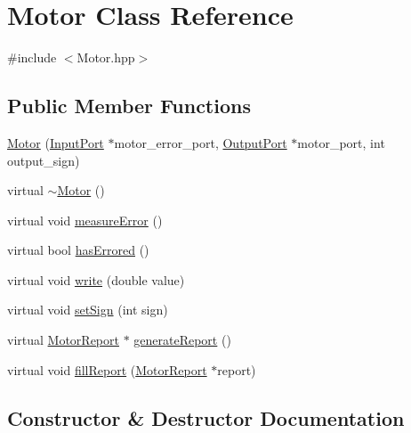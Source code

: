 \hypertarget{classMotor}{}\section{Motor Class Reference}
\label{classMotor}


{\ttfamily \#include $<$Motor.\+hpp$>$}

\subsection*{Public Member Functions}
\begin{DoxyCompactItemize}
\item 
\hyperlink{classMotor_a261f6bcd243dc3c1b75d3470267cff14}{Motor} (\hyperlink{classInputPort}{Input\+Port} $\ast$motor\+\_\+error\+\_\+port, \hyperlink{classOutputPort}{Output\+Port} $\ast$motor\+\_\+port, int output\+\_\+sign)
\item 
virtual \hyperlink{classMotor_a2e57c7b2681efea1d3b7f253ee88ecd4}{$\sim$\+Motor} ()
\item 
virtual void \hyperlink{classMotor_a5f4255bf25f573578372e2624004a039}{measure\+Error} ()
\item 
virtual bool \hyperlink{classMotor_ae23dc03c27e126392d29242cb90b47dd}{has\+Errored} ()
\item 
virtual void \hyperlink{classMotor_acb75763c3b4b97ddd0630dbc9c58c81a}{write} (double value)
\item 
virtual void \hyperlink{classMotor_a7fe803d981566a886f02ee1e5b0c47b0}{set\+Sign} (int sign)
\item 
virtual \hyperlink{classMotorReport}{Motor\+Report} $\ast$ \hyperlink{classMotor_a738a98b0e1b6df12e23539838982b131}{generate\+Report} ()
\item 
virtual void \hyperlink{classMotor_ae83def821afb550743cdb69baea9307f}{fill\+Report} (\hyperlink{classMotorReport}{Motor\+Report} $\ast$report)
\end{DoxyCompactItemize}


\subsection{Constructor \& Destructor Documentation}
